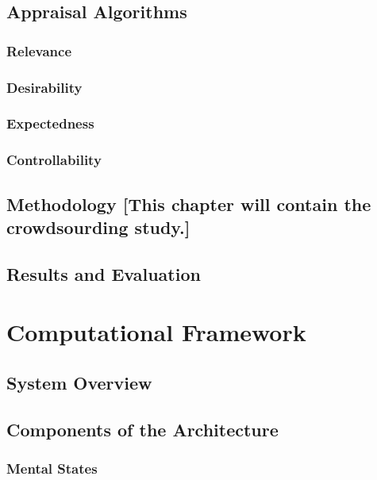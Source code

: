 \documentclass[12pt]{report}
\begin{document}
\section{Appraisal Algorithms}

\subsection{Relevance}

\subsection{Desirability}

\subsection{Expectedness}

\subsection{Controllability}

\section{Methodology [This chapter will contain the crowdsourding study.]}

\section{Results and Evaluation}

\chapter{Computational Framework}
\label{ch:framework}

\section{System Overview}

\section{Components of the Architecture}

\subsection{Mental States}
\end{document}
